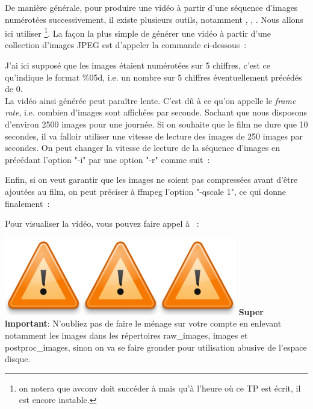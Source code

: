De manière générale, pour produire une vidéo à partir d'une séquence d'images numérotées successivement, il existe plusieurs outils, notamment \mencoder, \ffmpeg, \avconv. Nous allons ici utiliser \ffmpeg\footnote{on notera que avconv doit succéder à \ffmpeg mais qu'à l'heure o{\`u} ce TP est écrit, il est encore instable.}.  La façon la plus simple de générer une vidéo à partir d'une collection d'images JPEG est d'appeler la commande ci-dessous~:
\begin{center}
\end{center}
J'ai ici supposé que les images étaient numérotées sur 5 chiffres, c'est ce qu'indique le format \%05d, i.e. un nombre sur 5 chiffres éventuellement précédés de 0.\\

La vidéo ainsi générée peut paraître lente. C'est dû à ce qu'on appelle le \emph{frame rate}, i.e. combien d'images sont affichées par seconde. Sachant que nous disposons d'environ 2500 images pour une journée. Si on souhaite que le film ne dure que 10 secondes, il va falloir utiliser une vitesse de lecture des images de 250 images par secondes. On peut changer la vitesse de lecture de la séquence d'images en précédant l'option "-i" par une option "-r" comme suit~:
\begin{center}
\end{center}
Enfin, si on veut garantir que les images ne soient pas compressées avant d'être ajoutées au film, on peut préciser à ffmpeg l'option "-qscale 1", ce qui donne finalement~:
\begin{center}
\end{center}

Pour visualiser la vidéo, vous pouvez faire appel à \mplayer~:
\begin{center}
\end{center}


\begin{center}
\colorbox{lblue}{\begin{minipage}{\linewidth}
\includegraphics[width=0.05\columnwidth]{Figs/warning.png}\includegraphics[width=0.05\columnwidth]{Figs/warning.png}\includegraphics[width=0.05\columnwidth]{Figs/warning.png}
\textbf{Super important}: N'oubliez pas de faire le ménage sur votre compte en enlevant notamment les images dans les répertoires raw\_images, images et postproc\_images, sinon on va se faire gronder pour utilisation abusive de l'espace disque.
\end{minipage}}
\end{center}

